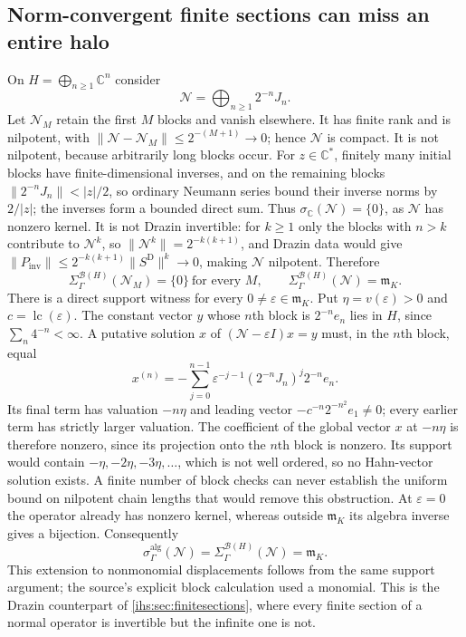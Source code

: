 \documentclass[11pt,a4paper]{article}
\numberwithin{equation}{section}
\theoremstyle{definition}
\theoremstyle{remark}
\newcommand{\C}{\mathbb C}
\newcommand{\mK}{\mathfrak m_K}
\newcommand{\B}{\mathcal B(H)}
\newcommand{\eps}{\varepsilon}
\newcommand{\abs}[1]{\lvert#1\rvert}
\newcommand{\norm}[1]{\lVert#1\rVert}
\newcommand{\lc}{\operatorname{lc}}
\begin{document}
\subsection{Norm-convergent finite sections can miss an entire halo}\label{ihs:dz:sec:blocks}
On $H=\bigoplus_{n\ge1}\C^n$ consider
\begin{equation}\label{ihs:dz:eq:blocks}
 \mathcal N=\bigoplus_{n\ge1}2^{-n}J_n.
\end{equation}
Let $\mathcal N_M$ retain the first $M$ blocks and vanish elsewhere. It has
finite rank and is nilpotent, with $\norm{\mathcal N-\mathcal N_M}\le
2^{-(M+1)}\to0$; hence $\mathcal N$ is compact. It is not nilpotent, because
arbitrarily long blocks occur. For $z\in\C^*$, finitely many initial blocks
have finite-dimensional inverses, and on the remaining blocks
$\norm{2^{-n}J_n}<\abs z/2$, so ordinary Neumann series bound their inverse
norms by $2/\abs z$; the inverses form a bounded direct sum. Thus
$\sigma_\C(\mathcal N)=\{0\}$, as $\mathcal N$ has nonzero kernel. It is not
Drazin invertible: for $k\ge1$ only the blocks with $n>k$ contribute to
$\mathcal N^k$, so $\norm{\mathcal N^k}=2^{-k(k+1)}$, and Drazin data would
give $\norm{P_{\mathrm{inv}}}\le2^{-k(k+1)}\norm{S^{\mathrm D}}^k\to0$, making
$\mathcal N$ nilpotent. Therefore
\begin{equation}\label{ihs:dz:eq:finitefailure}
 \Sigma^{\B}_\Gamma(\mathcal N_M)=\{0\}\ \text{for every }M,\qquad
 \Sigma^{\B}_\Gamma(\mathcal N)=\mK.
\end{equation}
There is a direct support witness for every $0\ne\eps\in\mK$. Put
$\eta=v(\eps)>0$ and $c=\lc(\eps)$. The constant vector $y$ whose $n$th
block is $2^{-n}e_n$ lies in $H$, since $\sum_n4^{-n}<\infty$. A putative
solution $x$ of $(\mathcal N-\eps I)x=y$ must, in the $n$th block, equal
\[
 x^{(n)}=-\sum_{j=0}^{n-1}\eps^{-j-1}(2^{-n}J_n)^j2^{-n}e_n.
\]
Its final term has valuation $-n\eta$ and leading vector
$-c^{-n}2^{-n^2}e_1\ne0$; every earlier term has strictly larger valuation.
The coefficient of the global vector $x$ at $-n\eta$ is therefore nonzero,
since its projection onto the $n$th block is nonzero. Its support would contain
$-\eta,-2\eta,-3\eta,\ldots$, which is not well ordered, so no Hahn-vector
solution exists. A finite number of block checks can never establish the
uniform bound on nilpotent chain lengths that would remove this obstruction.
At $\eps=0$ the operator already has nonzero kernel,
whereas outside $\mK$ its algebra inverse gives a bijection. Consequently
\[
 \sigma^{\mathrm{alg}}_\Gamma(\mathcal N)
 =\Sigma^{\B}_\Gamma(\mathcal N)=\mK.
\]
This extension to nonmonomial displacements follows from the same support
argument; the source's explicit block calculation used a monomial.
This is the Drazin counterpart of \cref{ihs:sec:finitesections}, where every
finite section of a normal operator is invertible but the infinite one is
not.
\end{document}
